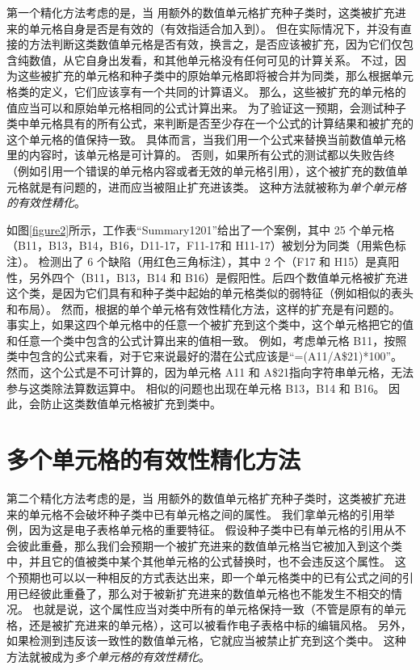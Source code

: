 第一个精化方法考虑的是，当 \wa 用额外的数值单元格扩充种子类时，这类被扩充进来的单元格自身是否是有效的（有效指适合加入到）。
但在实际情况下，并没有直接的方法判断这类数值单元格是否有效，换言之，是否应该被扩充，因为它们仅包含纯数值，从它自身出发看，和其他单元格没有任何可见的计算关系。
不过，因为这些被扩充的单元格和种子类中的原始单元格即将被合并为同类，那么根据单元格类的定义，它们应该享有一个共同的计算语义。
那么，这些被扩充的单元格的值应当可以和原始单元格相同的公式计算出来。
为了验证这一预期，\wa 会测试种子类中单元格具有的所有公式，来判断是否至少存在一个公式的计算结果和被扩充的这个单元格的值保持一致。
具体而言，当我们用一个公式来替换当前数值单元格里的内容时，该单元格是可计算的。
否则，如果所有公式的测试都以失败告终（例如引用一个错误的单元格内容或者无效的单元格引用），这个被扩充的数值单元格就是有问题的，进而应当被阻止扩充进该类。
这种方法就被称为\textit{单个单元格的有效性精化}。

如图\ref{figure2}所示，工作表“Summary1201”给出了一个案例，其中 25 个单元格（B11，B13，B14，B16，D11-17，F11-17和 H11-17）被\cu 划分为同类（用紫色标注）。
\cu 检测出了 6 个缺陷（用红色三角标注），其中 2 个（F17 和 H15）是真阳性，另外四个（B11，B13，B14 和 B16）是假阳性。后四个数值单元格被扩充进这个类，是因为它们具有和种子类中起始的单元格类似的弱特征（例如相似的表头和布局）。
然而，根据\wa 的单个单元格有效性精化方法，这样的扩充是有问题的。
事实上，如果这四个单元格中的任意一个被扩充到这个类中，这个单元格把它的值和任意一个类中包含的公式计算出来的值相一致。
例如，考虑单元格 B11，按照类中包含的公式来看，对于它来说最好的潜在公式应该是“=(A11/A\$21)*100”。
然而，这个公式是不可计算的，因为单元格 A11 和 A\$21指向字符串单元格，无法参与这类除法算数运算中。
相似的问题也出现在单元格 B13，B14 和 B16。 
因此，\wa 会防止这类数值单元格被扩充到类中。

\section{多个单元格的有效性精化方法}



第二个精化方法考虑的是，当 \wa 用额外的数值单元格扩充种子类时，这类被扩充进来的单元格不会破坏种子类中已有单元格之间的属性。
我们拿单元格的引用举例，因为这是电子表格单元格的重要特征。
假设种子类中已有单元格的引用从不会彼此重叠，那么我们会预期一个被扩充进来的数值单元格当它被加入到这个类中，并且它的值被类中某个其他单元格的公式替换时，也不会违反这个属性。
这个预期也可以以一种相反的方式表达出来，即一个单元格类中的已有公式之间的引用已经彼此重叠了，那么对于被新扩充进来的数值单元格也不能发生不相交的情况。
也就是说，这个属性应当对类中所有的单元格保持一致（不管是原有的单元格，还是被扩充进来的单元格），这可以被看作电子表格中标的编辑风格。
另外，如果检测到违反该一致性的数值单元格，它就应当被禁止扩充到这个类中。
这种方法就被成为\textit{多个单元格的有效性精化}。


